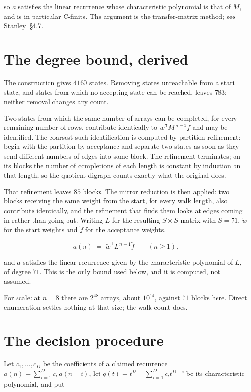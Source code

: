 \documentclass[11pt]{article}
\theoremstyle{definition}
\begin{document}
so $a$ satisfies the linear recurrence whose characteristic polynomial is that of $M$, and is in particular C-finite. The argument is the transfer-matrix method; see Stanley~\S4.7.

\section{The degree bound, derived}

The construction gives $4160$ states. Removing states unreachable from a start state, and states from which no accepting state can be reached, leaves $783$; neither removal changes any count.

Two states from which the same number of arrays can be completed, for every remaining number of rows, contribute identically to $w^{\mathsf T}M^{\,n-1}f$ and may be identified. The coarsest such identification is computed by partition refinement: begin with the partition by acceptance and separate two states as soon as they send different numbers of edges into some block. The refinement terminates; on its blocks the number of completions of each length is constant by induction on that length, so the quotient digraph counts exactly what the original does.

That refinement leaves $85$ blocks. The mirror reduction is then applied: two blocks receiving the same weight from the start, for every walk length, also contribute identically, and the refinement that finds them looks at edges coming in rather than going out. Writing $L$ for the resulting $S \times S$ matrix with $S = 71$, $\tilde w$ for the start weights and $\tilde f$ for the acceptance weights,

\[a(n) \;=\; \tilde w^{\mathsf T} L^{\,n-1} \tilde f \qquad (n \ge 1),\]

and $a$ satisfies the linear recurrence given by the characteristic polynomial of $L$, of degree $71$. This is the only bound used below, and it is computed, not assumed.

For scale: at $n = 8$ there are $2^{48}$ arrays, about $10^{14}$, against $71$ blocks here. Direct enumeration settles nothing at that size; the walk count does.

\section{The decision procedure}

Let $c_1,\dots,c_D$ be the coefficients of a claimed recurrence $a(n) = \sum_{i=1}^{D} c_i\,a(n-i)$, let $q(t) = t^{D} - \sum_{i=1}^{D} c_i t^{D-i}$ be its characteristic polynomial, and put
\end{document}
